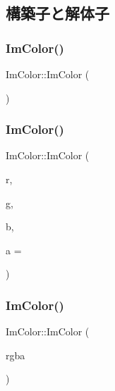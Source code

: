 \subsection{構築子と解体子}
\mbox{\label{struct_im_color_a95206b688dcc03f725790538c74f4526}} 
\subsubsection{\texorpdfstring{Im\+Color()}{ImColor()}\hspace{0.1cm}{\footnotesize\ttfamily [1/5]}}
{\footnotesize\ttfamily Im\+Color\+::\+Im\+Color (\begin{DoxyParamCaption}{ }\end{DoxyParamCaption})\hspace{0.3cm}{\ttfamily [inline]}}

\mbox{\label{struct_im_color_ab4ba02f8290d5dadc1ebc57b2c8a9cbe}} 
\subsubsection{\texorpdfstring{Im\+Color()}{ImColor()}\hspace{0.1cm}{\footnotesize\ttfamily [2/5]}}
{\footnotesize\ttfamily Im\+Color\+::\+Im\+Color (\begin{DoxyParamCaption}\item[{int}]{r,  }\item[{int}]{g,  }\item[{int}]{b,  }\item[{int}]{a = {} }\end{DoxyParamCaption})\hspace{0.3cm}{\ttfamily [inline]}}

\mbox{\label{struct_im_color_ad306332841a2b1f903f40262a19f9412}} 
\subsubsection{\texorpdfstring{Im\+Color()}{ImColor()}\hspace{0.1cm}{\footnotesize\ttfamily [3/5]}}
{\footnotesize\ttfamily Im\+Color\+::\+Im\+Color (\begin{DoxyParamCaption}\item[{\mbox{\hyperlink{imgui_8h_a118cff4eeb8d00e7d07ce3d6460eed36}{Im\+U32}}}]{rgba }\end{DoxyParamCaption})\hspace{0.3cm}{\ttfamily [inline]}}

